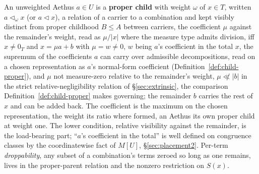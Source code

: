 \begin{defin}\label{def:child}
An unweighted Aethus $a \in U$ is a \textbf{proper child} with weight $\omega$ of $x \in T$, written $a \lhd_\omega x$ (or $a \lhd x$), a relation of a carrier to a combination and kept visibly distinct from proper childhood $B \le A$ between carriers, the coefficient $\mu$ against the remainder's weight, read as $\mu/\lvert x \rvert$ where the measure type admits division, iff $x \ne 0_T$ and $x = \mu a + b$ with $\mu = w \ne 0$, $w$ being $a$'s coefficient in the total $x$, the supremum of the coefficients $a$ can carry over admissible decompositions, read on a chosen representation as $a$'s normal-form coefficient (Definition~\ref{def:child-proper}), and $\mu$ not measure-zero relative to the remainder's weight, $\mu \not\ll \lvert b \rvert$ in the strict relative-negligibility relation of §\ref{sec:extrinsic}, the comparison Definition~\ref{def:child-proper} makes governing; the remainder $b$ carries the rest of $x$ and can be added back. The coefficient is the maximum on the chosen representation, the weight its ratio where formed, an Aethus its own proper child at weight one. The lower condition, relative visibility against the remainder, is the load-bearing part; ``$a$'s coefficient in the total'' is well defined on congruence classes by the coordinatewise fact of $M[U]$, §\ref{sec:placement2}. Per-term \emph{droppability}, any subset of a combination's terms zeroed so long as one remains, lives in the proper-parent relation and the nonzero restriction on $S(x)$.


\end{defin}

